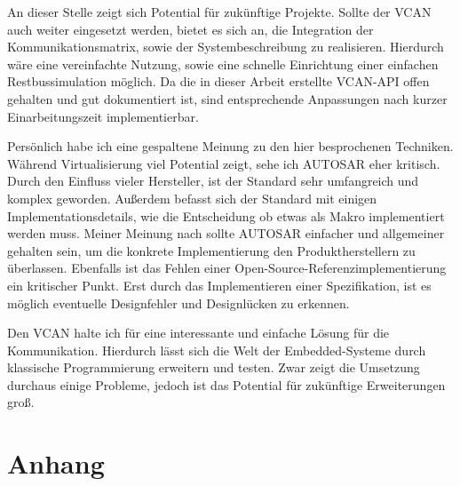 \documentclass[
  a4paper,					    %
  twoside,
  DIV=calc,     				%
  bibliography=totoc,
  cleardoublepage=empty,
  ngerman,     					%
  final       					%
]{scrbook}
\begin{document}
An dieser Stelle zeigt sich Potential für zukünftige Projekte. Sollte der VCAN auch weiter eingesetzt werden, bietet es sich an, die Integration der Kommunikationsmatrix, sowie der Systembeschreibung zu realisieren. Hierdurch wäre eine vereinfachte Nutzung, sowie eine schnelle Einrichtung einer einfachen Restbussimulation möglich. Da die in dieser Arbeit erstellte VCAN-API offen gehalten und gut dokumentiert ist, sind entsprechende Anpassungen nach kurzer Einarbeitungszeit implementierbar.

Persönlich habe ich eine gespaltene Meinung zu den hier besprochenen Techniken. Während Virtualisierung viel Potential zeigt, sehe ich AUTOSAR eher kritisch. Durch den Einfluss vieler Hersteller, ist der Standard sehr umfangreich und komplex geworden. Außerdem befasst sich der Standard mit einigen Implementationsdetails, wie die Entscheidung ob etwas als Makro implementiert werden muss. Meiner Meinung nach sollte AUTOSAR einfacher und allgemeiner gehalten sein, um die konkrete Implementierung den Produktherstellern zu überlassen. Ebenfalls ist das Fehlen einer Open-Source-Referenzimplementierung ein kritischer Punkt. Erst durch das Implementieren einer Spezifikation, ist es möglich eventuelle Designfehler und Designlücken zu erkennen.

Den VCAN halte ich für eine interessante und einfache Lösung für die Kommunikation. Hierdurch lässt sich die Welt der Embedded-Systeme durch klassische Programmierung erweitern und testen. Zwar zeigt die Umsetzung durchaus einige Probleme, jedoch ist das Potential für zukünftige Erweiterungen groß.












\appendix
\part*{Anhang}





\backmatter
\end{document}
